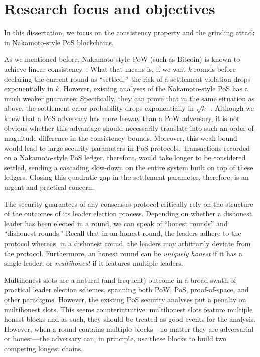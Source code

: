 \section{Research focus and objectives}
In this dissertation, 
we focus on the consistency property and the grinding attack in Nakamoto-style PoS blockchains.

As we mentioned before, Nakamoto-style PoW (such as Bitcoin) 
is known to achieve linear consistency~\cite{GKL,PSS,Nakamoto2008}. 
What that means is, if we wait $k$ rounds before declaring the current round as ``settled,'' 
the risk of a settlement violation drops exponentially in $k$. 
However, existing analyses of the Nakamoto-style PoS has a much weaker guarantee: 
Specifically, they can prove that in the same situation as above, 
the settlement error probability drops exponentially in $\sqrt{k}$~\cite{Ouroboros,SnowWhite,Sleepy}. 
Although we know that a PoS adversary has more leeway than a PoW adversary, 
it is not obvious whether this advantage should necessarily translate into such 
an order-of-magnitude difference in the consistency bounds. 
Moreover, this weak bound would lead to large security parameters in PoS protocols. 
Transactions recorded on a Nakamoto-style PoS ledger, therefore, 
would take longer to be considered settled, 
sending a cascading slow-down on the entire system built on top of these ledgers.
Closing this quadratic gap in the settlement parameter, therefore, is an urgent and practical concern.


The security guarantees of any consensus protocol 
critically rely on the structure 
of the outcomes of its leader election process. 
Depending on whether a dishonest leader has been elected in a round, 
we can speak of ``honest rounds'' and ``dishonest rounds.'' 
Recall that in an honest round, the leaders adhere to the protocol whereas, 
in a dishonest round, the leaders may arbitrarily deviate from the protocol. 
Furthermore, an honest round can be \emph{uniquely honest} if it has a single leader, 
or \emph{multihonest} if it features multiple leaders. 

Multihonest slots are a natural (and frequent) outcome 
in a broad swath of practical leader election schemes, 
spanning both PoW, PoS, proof-of-space, and other paradigms. 
However, the existing PoS security analyses put a penalty on multihonest slots. 
This seems counterintuitive: multihonest slots feature multiple honest blocks 
and as such, they should be treated as good events for the analysis. 
However, when a round contains multiple blocks---no matter they are adversarial or honest---the adversary can, 
in principle, use these blocks to build two competing longest chains. 

